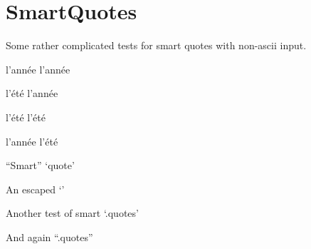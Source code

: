
\def\mytitle{SmartQuotes Test}


\part{SmartQuotes}
\label{smartquotes}

Some rather complicated tests for smart quotes with non-ascii input.

l'année l'année

l'été l'année

l'été l'été

l'année l'été

``Smart'' `quote'

An escaped `\textbar{}'

Another test of smart `.quotes'

And again ``.quotes''




